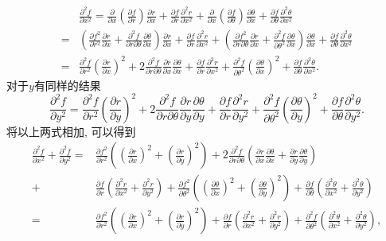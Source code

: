 \begin{quiza}
\begin{solution}
\[\begin{split}
&\frac{\partial^2f}{\partial x^2}=\frac{\partial}{\partial x}\left(\frac{\partial f}{\partial r}\right)\frac{\partial r}{\partial x}+\frac{\partial f}{\partial r}\frac{\partial^2r}{\partial x^2}+\frac{\partial}{\partial x}\left(\frac{\partial f}{\partial \theta}\right)\frac{\partial \theta}{\partial x}+\frac{\partial f}{\partial \theta}\frac{\partial^2\theta}{\partial x^2}\\=&\left(\frac{\partial f^2}{\partial r^2}\frac{\partial r}{\partial x}+\frac{\partial^2f}{\partial r\partial\theta}\frac{\partial\theta}{\partial x}\right)\frac{\partial r}{\partial x}+\frac{\partial f}{\partial r}\frac{\partial^2r}{\partial x^2}+\left(\frac{\partial f^2}{\partial r\partial\theta}\frac{\partial r}{\partial x}+\frac{\partial^2f}{\partial\theta^2}\frac{\partial\theta}{\partial x}\right)\frac{\partial\theta}{\partial x}+\frac{\partial f}{\partial\theta}\frac{\partial^2\theta}{\partial x^2}\\
=&\frac{\partial^2f}{\partial r^2}\left(\frac{\partial r}{\partial x}\right)^2+2\frac{\partial^2f}{\partial r\partial\theta}\frac{\partial r}{\partial x}\frac{\partial\theta}{\partial x}+\frac{\partial f}{\partial r}\frac{\partial^2r}{\partial x^2}+\frac{\partial^2f}{\partial \theta^2}\left(\frac{\partial\theta}{\partial x}\right)^2+\frac{\partial f}{\partial\theta}\frac{\partial^2\theta}{\partial x^2}.
\end{split}\]
对于\(y\)有同样的结果\[\frac{\partial^2f}{\partial y^2}=\frac{\partial^2f}{\partial r^2}\left(\frac{\partial r}{\partial y}\right)^2+2\frac{\partial^2f}{\partial r\partial\theta}\frac{\partial r}{\partial y}\frac{\partial\theta}{\partial y}+\frac{\partial f}{\partial r}\frac{\partial^2r}{\partial y^2}+\frac{\partial^2f}{\partial \theta^2}\left(\frac{\partial\theta}{\partial y}\right)^2+\frac{\partial f}{\partial\theta}\frac{\partial^2\theta}{\partial y^2}.\]将以上两式相加, 可以得到\[\begin{split}
\frac{\partial^2f}{\partial x^2}+\frac{\partial^2f}{\partial y^2}=&\frac{\partial f^2}{\partial r^2}\left(\left(\frac{\partial r}{\partial x}\right)^2+\left(\frac{\partial r}{\partial y}\right)^2\right)+2\frac{\partial^2f}{\partial r\partial\theta}\left(\frac{\partial r}{\partial x}\frac{\partial\theta}{\partial x}+\frac{\partial r}{\partial y}\frac{\partial\theta}{\partial y}\right)\\+&\frac{\partial f}{\partial r}\left(\frac{\partial^2r}{\partial x^2}+\frac{\partial^2r}{\partial y^2}\right)+\frac{\partial f^2}{\partial\theta^2}\left(\left(\frac{\partial\theta}{\partial x}\right)^2+\left(\frac{\partial\theta}{\partial y}\right)^2\right)+\frac{\partial f}{\partial\theta}\left(\frac{\partial^2\theta}{\partial x^2}+\frac{\partial^2\theta}{\partial y^2}\right)\\=&\frac{\partial f^2}{\partial r^2}\left(\left(\frac{\partial r}{\partial x}\right)^2+\left(\frac{\partial r}{\partial y}\right)^2\right)+\frac{\partial f}{\partial r}\left(\frac{\partial^2r}{\partial x^2}+\frac{\partial^2r}{\partial y^2}\right)+\frac{\partial^2 f}{\partial\theta^2}\left(\frac{\partial^2\theta}{\partial x^2}+\frac{\partial^2\theta}{\partial y^2}\right),

\end{split}\]
\end{solution}
\end{quiza}
